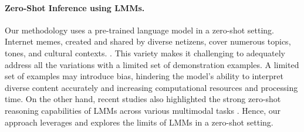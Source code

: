 \paragraph{Zero-Shot Inference using LMMs.} Our methodology uses a pre-trained language model in a zero-shot setting. Internet memes, created and shared by diverse netizens, cover numerous topics, tones, and cultural contexts. \cite{kiela2020hateful,fersini2022mami}. This variety makes it challenging to adequately address all the variations with a limited set of demonstration examples. A limited set of examples may introduce bias, hindering the model's ability to interpret diverse content accurately and increasing computational resources and processing time. On the other hand, recent studies also highlighted the strong zero-shot reasoning capabilities of LMMs across various multimodal tasks \cite{yang2023dawn,fu2023mme}. Hence, our approach leverages and explores the limits of LMMs in a zero-shot setting.



